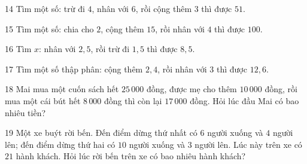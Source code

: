 \gap
\begin{probbox}{14}{\relax}
Tìm một số: trừ đi $4$, nhân với $6$, rồi cộng thêm $3$ thì được $51$.
\end{probbox}
\gap
\begin{probbox}{15}{\relax}
Tìm một số: chia cho $2$, cộng thêm $15$, rồi nhân với $4$ thì được $100$.
\end{probbox}
\gap
\begin{probbox}{16}{\relax}
Tìm $x$: nhân với $2{,}5$, rồi trừ đi $1{,}5$ thì được $8{,}5$.
\end{probbox}
\gap
\begin{probbox}{17}{\relax}
Tìm một số thập phân: cộng thêm $2{,}4$, rồi nhân với $3$ thì được $12{,}6$.
\end{probbox}
\gap
\begin{probbox}{18}{\relax}
Mai mua một cuốn sách hết $25\,000$ đồng, được mẹ cho thêm $10\,000$ đồng, rồi mua một cái bút hết $8\,000$ đồng thì còn lại $17\,000$ đồng. Hỏi lúc đầu Mai có bao nhiêu tiền?
\end{probbox}
\gap
\begin{probbox}{19}{\relax}
Một xe buýt rời bến. Đến điểm dừng thứ nhất có $6$ người xuống và $4$ người lên; đến điểm dừng thứ hai có $10$ người xuống và $3$ người lên. Lúc này trên xe có $21$ hành khách. Hỏi lúc rời bến trên xe có bao nhiêu hành khách?
\end{probbox}
